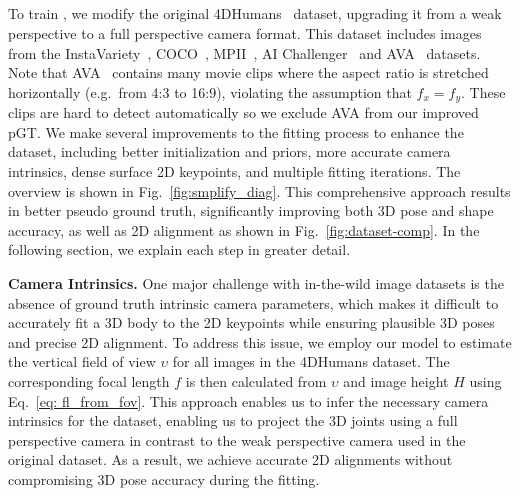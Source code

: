 \subsection{\camsmplify}
To train \hpsmodel, we modify the original 4DHumans~\cite{hmr2} dataset, upgrading it from a weak perspective to a full perspective camera format. This dataset includes images from the
InstaVariety~\cite{insta}, COCO~\cite{coco}, MPII~\cite{mpii}, AI Challenger~\cite{aic}
and AVA~\cite{ava} datasets.
Note that AVA~\cite{ava} contains many movie clips where the aspect ratio is stretched horizontally (e.g.~from 4:3 to 16:9), violating the assumption that $f_x = f_y$. These clips are hard to detect automatically so we exclude AVA from our improved pGT.
We make several improvements to the fitting process to enhance the dataset, including better initialization and priors, more accurate camera intrinsics, dense surface 2D keypoints, and multiple fitting iterations. The overview is shown in Fig.~\ref{fig:smplify_diag}. This comprehensive approach results in better pseudo ground truth, significantly improving both 3D pose and shape accuracy, as well as 2D alignment as shown in Fig.~\ref{fig:dataset-comp}. In the following section, we explain each step in greater detail.

\noindent\textbf{Camera Intrinsics.}
One major challenge with in-the-wild image datasets is the absence of ground truth intrinsic camera parameters, which makes it difficult to accurately fit a 3D body to the 2D keypoints while ensuring plausible 3D poses and precise 2D alignment. To address this issue, we employ our  \cameramodel model to estimate the vertical field of view $\upsilon$ for all images in the 4DHumans dataset. The corresponding focal length $f$ is then calculated from $\upsilon$ and image height $H$ using Eq.~\ref{eq: fl_from_fov}. This approach enables us to infer the necessary camera intrinsics for the dataset, enabling us to project the 3D joints using a full perspective camera in contrast to the weak perspective camera used in the original dataset. As a result, we achieve accurate 2D alignments without compromising 3D pose accuracy during the fitting.

